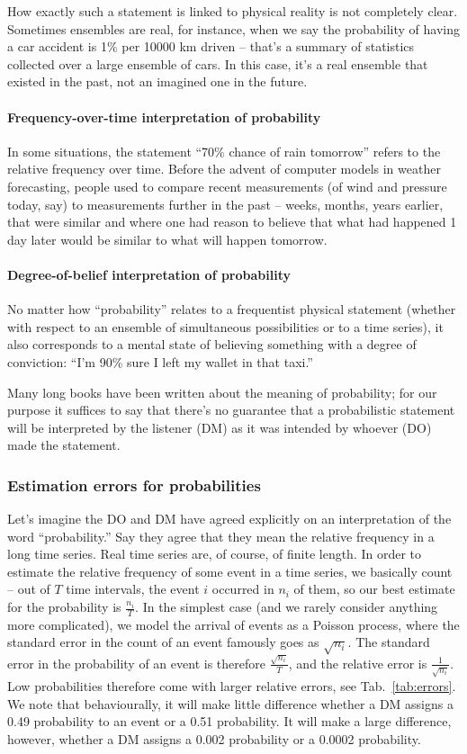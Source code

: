 \documentclass[a4paper, 12pt]{article}
\newcommand{\tref}[1]{Tab.~\ref{tab:#1}}
\begin{document}
How exactly such a statement is linked to physical reality is not completely clear. Sometimes ensembles are real, for instance, when we say the probability of having a car accident is 1\% per 10000 km driven -- that's a summary of statistics collected over a large ensemble of cars. In this case, it's a real ensemble that existed in the past, not an imagined one in the future. 

\paragraph{Frequency-over-time interpretation of probability}
In some situations, the statement ``70\% chance of rain tomorrow'' refers to the relative frequency over time. Before the advent of computer models in weather forecasting, people used to compare recent measurements (of wind and pressure today, say) to measurements further in the past -- weeks, months, years earlier, that were similar and where one had reason to believe that what had happened 1 day later would be similar to what will happen tomorrow.

\paragraph{Degree-of-belief interpretation of probability}
No matter how ``probability'' relates to a frequentist physical statement (whether with respect to an ensemble of simultaneous possibilities or to a time series), it also corresponds to a mental state of believing something with a degree of conviction: ``I'm 90\% sure I left my wallet in that taxi.''

Many long books have been written about the meaning of probability; for our purpose it suffices to say that there's no guarantee that a probabilistic statement will be interpreted by the listener (DM) as it was intended by whoever (DO) made the statement.

\subsubsection*{Estimation errors for probabilities}
Let's imagine the DO and DM have agreed explicitly on an interpretation of the word ``probability.'' Say they agree that they mean the relative frequency in a long time series. Real time series are, of course, of finite length. In order to estimate the relative frequency of some event in a time series, we basically count -- out of $T$ time intervals, the event $i$ occurred in $n_i$ of them, so our best estimate for the probability is $\frac{n_i}{T}$. In the simplest case (and we rarely consider anything more complicated), we model the arrival of events as a Poisson process, where the standard error in the count of an event famously goes as $\sqrt{n_i}$. The standard error in the probability of an event is therefore $\frac{\sqrt{n_i}}{T}$, and the relative error is $\frac{1}{\sqrt{n_i}}$. Low probabilities therefore come with larger relative errors, see \tref{errors}. We note that behaviourally, it will make little difference whether a DM assigns a 0.49 probability to an event or a 0.51 probability. It will make a large difference, however, whether a DM assigns a 0.002 probability or a 0.0002 probability.
\end{document}
